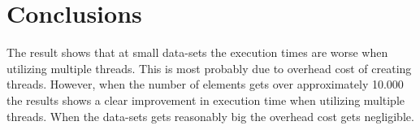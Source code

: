 \documentclass{article}
\begin{document}
\section{Conclusions}

The result shows that at small data-sets the execution times are worse when utilizing multiple threads. This is most probably due to overhead cost of creating threads. However, when the number of elements gets over approximately 10.000 the results shows a clear improvement in execution time when utilizing multiple threads. When the data-sets gets reasonably big the overhead cost gets negligible. 












\end{document}

